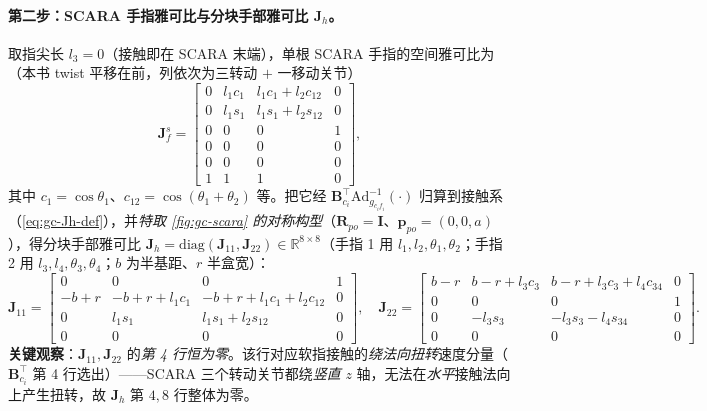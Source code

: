 \paragraph{第二步：SCARA 手指雅可比与分块手部雅可比 $\mathbf{J}_h$。}
取指尖长 $l_3=0$（接触即在 SCARA 末端），单根 SCARA 手指的空间雅可比为（本书 twist 平移在前，列依次为三转动 $+$ 一移动关节）\cite{murray1994mathematical}
\begin{equation}
\mathbf{J}^s_{f}=\begin{bmatrix}
0 & l_1c_1 & l_1c_1+l_2c_{12} & 0\\
0 & l_1s_1 & l_1s_1+l_2s_{12} & 0\\
0 & 0 & 0 & 1\\
0 & 0 & 0 & 0\\
0 & 0 & 0 & 0\\
1 & 1 & 1 & 0
\end{bmatrix},
\label{eq:gc-scara-Js}
\end{equation}
其中 $c_1=\cos\theta_1$、$c_{12}=\cos(\theta_1+\theta_2)$ 等。把它经 $\mathbf{B}_{c_i}^\top\mathrm{Ad}_{g_{c_if_i}}^{-1}(\cdot)$ 归算到接触系（\cref{eq:gc-Jh-def}），并\emph{特取 \cref{fig:gc-scara} 的对称构型}（$\mathbf{R}_{po}=\mathbf{I}$、$\mathbf{p}_{po}=(0,0,a)$），得分块手部雅可比 $\mathbf{J}_h=\mathrm{diag}(\mathbf{J}_{11},\mathbf{J}_{22})\in\mathbb{R}^{8\times8}$（手指 1 用 $l_1,l_2,\theta_1,\theta_2$；手指 2 用 $l_3,l_4,\theta_3,\theta_4$；$b$ 为半基距、$r$ 半盒宽）：
\begin{equation}
\mathbf{J}_{11}=\begin{bmatrix}
0&0&0&1\\
-b+r & -b+r+l_1c_1 & -b+r+l_1c_1+l_2c_{12} & 0\\
0 & l_1s_1 & l_1s_1+l_2s_{12} & 0\\
0&0&0&0
\end{bmatrix},\quad
\mathbf{J}_{22}=\begin{bmatrix}
b-r & b-r+l_3c_3 & b-r+l_3c_3+l_4c_{34} & 0\\
0&0&0&1\\
0 & -l_3s_3 & -l_3s_3-l_4s_{34} & 0\\
0&0&0&0
\end{bmatrix}.
\label{eq:gc-scara-Jh}
\end{equation}
\textbf{关键观察}：$\mathbf{J}_{11},\mathbf{J}_{22}$ 的\emph{第 4 行恒为零}。该行对应软指接触的\emph{绕法向扭转}速度分量（$\mathbf{B}_{c_i}^\top$ 第 4 行选出）——SCARA 三个转动关节都绕\emph{竖直} $z$ 轴，无法在\emph{水平}接触法向上产生扭转，故 $\mathbf{J}_h$ 第 $4,8$ 行整体为零。

